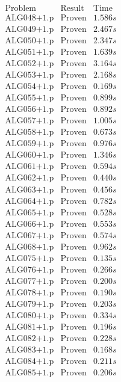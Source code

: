 \documentclass[a4paper,11pt]{report}
\theoremstyle{definition}
\theoremstyle{definition}
\theoremstyle{definition}
\theoremstyle{definition}
\theoremstyle{definition}
\theoremstyle{definition}
\theoremstyle{definition}
\begin{document}
	\begin{minipage}{0.45\textwidth}
		\[\begin{matrix}
			\text{Problem}&\text{Result}&\text{Time}\\
			\text{ALG048+1.p}&\text{Proven}& 1.586 s\\
			\text{ALG049+1.p}&\text{Proven}& 2.467 s\\
			\text{ALG050+1.p}&\text{Proven}& 2.347 s\\
			\text{ALG051+1.p}&\text{Proven}& 1.639 s\\
			\text{ALG052+1.p}&\text{Proven}& 3.164 s\\
			\text{ALG053+1.p}&\text{Proven}& 2.168 s\\
			\text{ALG054+1.p}&\text{Proven}& 0.169 s\\
			\text{ALG055+1.p}&\text{Proven}& 0.899 s\\
			\text{ALG056+1.p}&\text{Proven}& 0.892 s\\
			\text{ALG057+1.p}&\text{Proven}& 1.005 s\\
			\text{ALG058+1.p}&\text{Proven}& 0.673 s\\
			\text{ALG059+1.p}&\text{Proven}& 0.976 s\\
			\text{ALG060+1.p}&\text{Proven}& 1.346 s\\
			\text{ALG061+1.p}&\text{Proven}& 0.594 s\\
			\text{ALG062+1.p}&\text{Proven}& 0.440 s\\
			\text{ALG063+1.p}&\text{Proven}& 0.456 s\\
			\text{ALG064+1.p}&\text{Proven}& 0.782 s\\
			\text{ALG065+1.p}&\text{Proven}& 0.528 s\\
			\text{ALG066+1.p}&\text{Proven}& 0.553 s\\
			\text{ALG067+1.p}&\text{Proven}& 0.574 s\\
			\text{ALG068+1.p}&\text{Proven}& 0.962 s\\
			\text{ALG075+1.p}&\text{Proven}& 0.135 s\\
			\text{ALG076+1.p}&\text{Proven}& 0.266 s\\
			\text{ALG077+1.p}&\text{Proven}& 0.200 s\\
			\text{ALG078+1.p}&\text{Proven}& 0.190 s\\
			\text{ALG079+1.p}&\text{Proven}& 0.203 s\\
			\text{ALG080+1.p}&\text{Proven}& 0.334 s\\
			\text{ALG081+1.p}&\text{Proven}& 0.196 s\\
			\text{ALG082+1.p}&\text{Proven}& 0.228 s\\
			\text{ALG083+1.p}&\text{Proven}& 0.168 s\\
			\text{ALG084+1.p}&\text{Proven}& 0.211 s\\
			\text{ALG085+1.p}&\text{Proven}& 0.206 s\\
		\end{matrix}\]
	\end{minipage}
	
\end{document}
